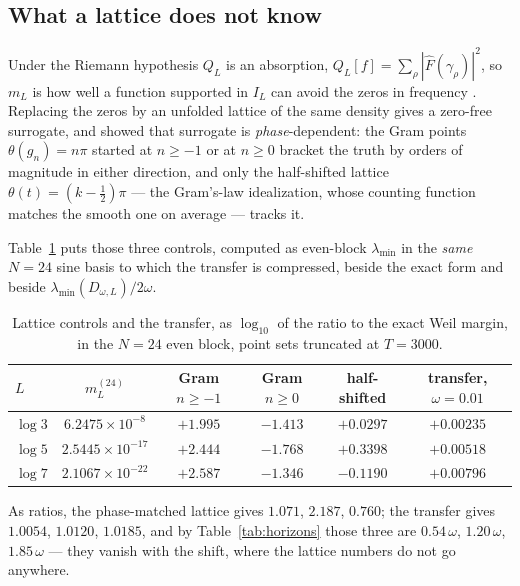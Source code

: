 \subsection{What a lattice does not know}\label{sec:lattice}

Under the Riemann hypothesis $Q_L$ is an absorption,
$Q_L[f]=\sum_\rho|\widehat F(\gamma_\rho)|^2$, so $m_L$ is how well a function
supported in $I_L$ can avoid the zeros in frequency
\cite[Section~7]{WilsonLines}. Replacing the zeros by an unfolded lattice of the
same density gives a zero-free surrogate, and \cite[Section~3]{WilsonReview}
showed that surrogate is \emph{phase}-dependent: the Gram points
$\theta(g_n)=n\pi$ started at $n\geq-1$ or at $n\geq0$ bracket the truth by
orders of magnitude in either direction, and only the half-shifted lattice
$\theta(t)=(k-\frac12)\pi$ --- the Gram's-law idealization, whose counting
function matches the smooth one on average --- tracks it.

Table~\ref{tab:lattice} puts those three controls, computed as even-block
$\lambda_{\min}$ in the \emph{same} $N=24$ sine basis to which the transfer is
compressed, beside the exact form and beside $\lambda_{\min}(D_{\omega,L})/2\omega$.

\begin{table}[ht]\centering\small
\caption{Lattice controls and the transfer, as $\log_{10}$ of the ratio to the
exact Weil margin, in the $N=24$ even block, point sets truncated at
$T=3000$.}\label{tab:lattice}
\begin{tabular}{@{}lccccc@{}}
\toprule
$L$ & $m_L^{(24)}$ & Gram $n\geq-1$ & Gram $n\geq0$ & half-shifted & transfer, $\omega=0.01$\\
\midrule
$\log3$ & $6.2475\times10^{-8}$ & $+1.995$ & $-1.413$ & $+0.0297$ & $+0.00235$\\
$\log5$ & $2.5445\times10^{-17}$ & $+2.444$ & $-1.768$ & $+0.3398$ & $+0.00518$\\
$\log7$ & $2.1067\times10^{-22}$ & $+2.587$ & $-1.346$ & $-0.1190$ & $+0.00796$\\
\bottomrule
\end{tabular}
\end{table}

As ratios, the phase-matched lattice gives $1.071$, $2.187$, $0.760$; the
transfer gives $1.0054$, $1.0120$, $1.0185$, and by Table~\ref{tab:horizons}
those three are $0.54\,\omega$, $1.20\,\omega$, $1.85\,\omega$ --- they vanish
with the shift, where the lattice numbers do not go anywhere.

